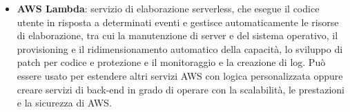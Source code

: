 \begin{itemize}
	\item \textbf{AWS Lambda}: servizio di elaborazione serverless, che esegue il codice utente in risposta a determinati eventi e gestisce automaticamente le risorse di elaborazione, tra cui la manutenzione di server e del sistema operativo, il provisioning e il ridimensionamento automatico della capacità, lo sviluppo di patch per codice e protezione e il monitoraggio e la creazione di log. Può essere usato per estendere altri servizi AWS con logica personalizzata oppure creare servizi di back-end in grado di operare con la scalabilità, le prestazioni e la sicurezza di AWS.
\end{itemize}